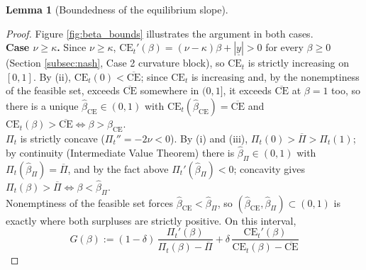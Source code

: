 \documentclass{article}
\theoremstyle{definition}
\newtheorem{lemma}{Lemma}[section]
\theoremstyle{plain}
\begin{document}
\begin{appendices}
\begin{lemma}[Boundedness of the equilibrium slope]
\end{lemma}
\begin{proof}
Figure \ref{fig:beta_bounds} illustrates the argument in both cases.\\
\textbf{Case $\nu\ge\kappa$.} Since $\nu\ge\kappa$, $\text{CE}_t'(\beta)=(\nu-\kappa)\beta+|\underline y|>0$ for every $\beta\ge0$ (Section \ref{subsec:nash}, Case 2 curvature block), so $\text{CE}_t$ is strictly increasing on $[0,1]$. By (ii), $\text{CE}_t(0)<\overline{\text{CE}}$; since $\text{CE}_t$ is increasing and, by the nonemptiness of the feasible set, exceeds $\overline{\text{CE}}$ somewhere in $(0,1]$, it exceeds $\overline{\text{CE}}$ at $\beta=1$ too, so there is a unique $\widehat\beta_{\mathrm{CE}}\in(0,1)$ with $\text{CE}_t(\widehat\beta_{\mathrm{CE}})=\overline{\text{CE}}$ and $\text{CE}_t(\beta)>\overline{\text{CE}} \iff \beta>\widehat\beta_{\mathrm{CE}}$.\\
$\Pi_t$ is strictly concave ($\Pi_t''=-2\nu<0$). By (i) and (iii), $\Pi_t(0)>\overline\Pi>\Pi_t(1)$; by continuity (Intermediate Value Theorem) there is $\widehat\beta_\Pi\in(0,1)$ with $\Pi_t(\widehat\beta_\Pi)=\overline\Pi$, and by the fact above $\Pi_t'(\widehat\beta_\Pi)<0$; concavity gives $\Pi_t(\beta)>\overline\Pi \iff \beta<\widehat\beta_\Pi$.\\
Nonemptiness of the feasible set forces $\widehat\beta_{\mathrm{CE}}<\widehat\beta_\Pi$, so $(\widehat\beta_{\mathrm{CE}},\widehat\beta_\Pi)\subset(0,1)$ is exactly where both surpluses are strictly positive. On this interval,
\[
G(\beta) := (1-\delta)\,\frac{\Pi_t'(\beta)}{\Pi_t(\beta)-\overline{\Pi}} + \delta\,\frac{\text{CE}_t'(\beta)}{\text{CE}_t(\beta)-\overline{\text{CE}}}
\]

\end{proof}
\end{appendices}
\end{document}
